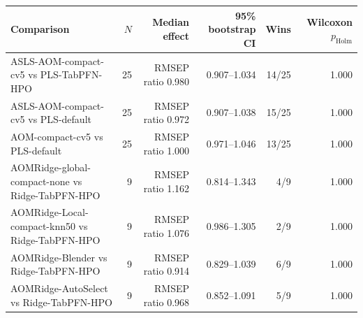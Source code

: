 \begin{tabularx}{\linewidth}{Xrrrrr}
\toprule
Comparison & $N$ & Median effect & 95\% bootstrap CI & Wins & Wilcoxon $p_{\mathrm{Holm}}$ \\
\midrule
ASLS-AOM-compact-cv5 vs PLS-TabPFN-HPO & 25 & RMSEP ratio 0.980 & 0.907--1.034 & 14/25 & 1.000 \\
ASLS-AOM-compact-cv5 vs PLS-default & 25 & RMSEP ratio 0.972 & 0.907--1.038 & 15/25 & 1.000 \\
AOM-compact-cv5 vs PLS-default & 25 & RMSEP ratio 1.000 & 0.971--1.046 & 13/25 & 1.000 \\
AOMRidge-global-compact-none vs Ridge-TabPFN-HPO & 9 & RMSEP ratio 1.162 & 0.814--1.343 & 4/9 & 1.000 \\
AOMRidge-Local-compact-knn50 vs Ridge-TabPFN-HPO & 9 & RMSEP ratio 1.076 & 0.986--1.305 & 2/9 & 1.000 \\
AOMRidge-Blender vs Ridge-TabPFN-HPO & 9 & RMSEP ratio 0.914 & 0.829--1.039 & 6/9 & 1.000 \\
AOMRidge-AutoSelect vs Ridge-TabPFN-HPO & 9 & RMSEP ratio 0.968 & 0.852--1.091 & 5/9 & 1.000 \\
\bottomrule
\end{tabularx}
